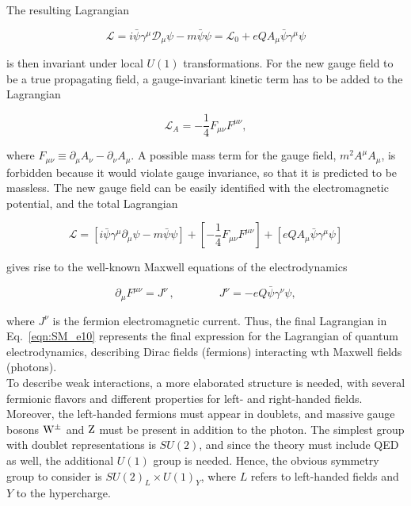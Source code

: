 The resulting Lagrangian

\begin{equation}\label{eqn:SM_e8}
\mathcal{L} = i\bar{\psi}\gamma^\mu\mathcal{D}_\mu\psi - m\bar{\psi}\psi = \mathcal{L}_0 + eQA_\mu\bar{\psi}\gamma^\mu\psi
\end{equation}

\noindent is then invariant under local $U(1)$ transformations.
For the new gauge field to be a true propagating field, a gauge-invariant kinetic term has to be added to the Lagrangian

\begin{equation}\label{eqn:SM_e9}
\mathcal{L}_A = -\frac{1}{4}F_{\mu\nu}F^{\mu\nu},
\end{equation}

\noindent where $F_{\mu\nu} \equiv \partial_\mu A_\nu - \partial_\nu A_\mu$. 
A possible mass term for the gauge field, $m^2A^\mu A_\mu$, is forbidden because it would violate gauge invariance,
so that it is predicted to be massless.
The new gauge field can be easily identified with the electromagnetic potential,
and the total Lagrangian 

\begin{equation}\label{eqn:SM_e10}
\mathcal{L} = \left[ i\bar{\psi}\gamma^\mu\partial_\mu\psi - m\bar{\psi}\psi \right] + \left[ -\frac{1}{4}F_{\mu\nu}F^{\mu\nu} \right] + [eQA_\mu\bar{\psi}\gamma^\mu\psi]
\end{equation}

\noindent gives rise to the well-known Maxwell equations of the electrodynamics

\begin{equation}\label{eqn:SM_e11}
\partial_\mu F^{\mu\nu} = J^\nu \, , \qquad\qquad J^\nu = -eQ\bar{\psi}\gamma^\nu\psi,
\end{equation}

\noindent where $J^\nu$ is the fermion electromagnetic current.
Thus, the final Lagrangian in Eq.~\ref{eqn:SM_e10} represents the final expression for the Lagrangian of quantum electrodynamics,
describing Dirac fields (fermions) interacting wth Maxwell fields (photons).\\

To describe weak interactions, a more elaborated structure is needed, with several fermionic flavors and different properties for left- and right-handed fields.
Moreover, the left-handed fermions must appear in doublets, and massive gauge bosons $\mathrm{W}^{\pm}$ and $\mathrm{Z}$ must be present in addition to the photon.
The simplest group with doublet representations is $SU(2)$, and since the theory must include QED as well, the additional $U(1)$ group is needed.
Hence, the obvious symmetry group to consider is $SU(2)_L \times U(1)_Y$, where $L$ refers to left-handed fields and $Y$ to the hypercharge.

